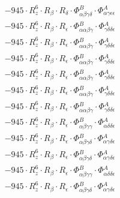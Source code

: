 \documentclass{article}
\begin{document}
\begin{subequations}
\begin{gather}
\begin{array}{c}
 \\[0.2em] 		 - 945 \cdot R_{z}^{6} \cdot R_{\beta{}} \cdot R_{\delta{}} \cdot \Phi{}^{B}_{\alpha{}\beta{}\gamma{}\delta{}} \cdot \Phi{}^{A}_{\alpha{}\gamma{}\epsilon{}\epsilon{}} 
 \\[0.2em] 		 - 945 \cdot R_{z}^{6} \cdot R_{\beta{}} \cdot R_{\epsilon{}} \cdot \Phi{}^{B}_{\alpha{}\alpha{}\beta{}\gamma{}} \cdot \Phi{}^{A}_{\gamma{}\delta{}\delta{}\epsilon{}} 
 \\[0.2em] 		 - 945 \cdot R_{z}^{6} \cdot R_{\beta{}} \cdot R_{\epsilon{}} \cdot \Phi{}^{B}_{\alpha{}\alpha{}\beta{}\gamma{}} \cdot \Phi{}^{A}_{\gamma{}\delta{}\delta{}\epsilon{}} 
 \\[0.2em] 		 - 945 \cdot R_{z}^{6} \cdot R_{\beta{}} \cdot R_{\epsilon{}} \cdot \Phi{}^{B}_{\alpha{}\alpha{}\beta{}\gamma{}} \cdot \Phi{}^{A}_{\gamma{}\delta{}\delta{}\epsilon{}} 
 \\[0.2em] 		 - 945 \cdot R_{z}^{6} \cdot R_{\beta{}} \cdot R_{\epsilon{}} \cdot \Phi{}^{B}_{\alpha{}\alpha{}\beta{}\gamma{}} \cdot \Phi{}^{A}_{\gamma{}\delta{}\delta{}\epsilon{}} 
 \\[0.2em] 		 - 945 \cdot R_{z}^{6} \cdot R_{\beta{}} \cdot R_{\epsilon{}} \cdot \Phi{}^{B}_{\alpha{}\alpha{}\beta{}\gamma{}} \cdot \Phi{}^{A}_{\gamma{}\delta{}\delta{}\epsilon{}} 
 \\[0.2em] 		 - 945 \cdot R_{z}^{6} \cdot R_{\beta{}} \cdot R_{\epsilon{}} \cdot \Phi{}^{B}_{\alpha{}\alpha{}\beta{}\gamma{}} \cdot \Phi{}^{A}_{\gamma{}\delta{}\delta{}\epsilon{}} 
 \\[0.2em] 		 - 945 \cdot R_{z}^{6} \cdot R_{\beta{}} \cdot R_{\epsilon{}} \cdot \Phi{}^{B}_{\alpha{}\beta{}\gamma{}\gamma{}} \cdot \Phi{}^{A}_{\alpha{}\delta{}\delta{}\epsilon{}} 
 \\[0.2em] 		 - 945 \cdot R_{z}^{6} \cdot R_{\beta{}} \cdot R_{\epsilon{}} \cdot \Phi{}^{B}_{\alpha{}\beta{}\gamma{}\delta{}} \cdot \Phi{}^{A}_{\alpha{}\gamma{}\delta{}\epsilon{}} 
 \\[0.2em] 		 - 945 \cdot R_{z}^{6} \cdot R_{\beta{}} \cdot R_{\epsilon{}} \cdot \Phi{}^{B}_{\alpha{}\beta{}\gamma{}\delta{}} \cdot \Phi{}^{A}_{\alpha{}\gamma{}\delta{}\epsilon{}} 
 \\[0.2em] 		 - 945 \cdot R_{z}^{6} \cdot R_{\beta{}} \cdot R_{\epsilon{}} \cdot \Phi{}^{B}_{\alpha{}\beta{}\gamma{}\gamma{}} \cdot \Phi{}^{A}_{\alpha{}\delta{}\delta{}\epsilon{}} 
 \\[0.2em] 		 - 945 \cdot R_{z}^{6} \cdot R_{\beta{}} \cdot R_{\epsilon{}} \cdot \Phi{}^{B}_{\alpha{}\beta{}\gamma{}\delta{}} \cdot \Phi{}^{A}_{\alpha{}\gamma{}\delta{}\epsilon{}} 

\end{array}
\end{gather}
\end{subequations}
\end{document}
